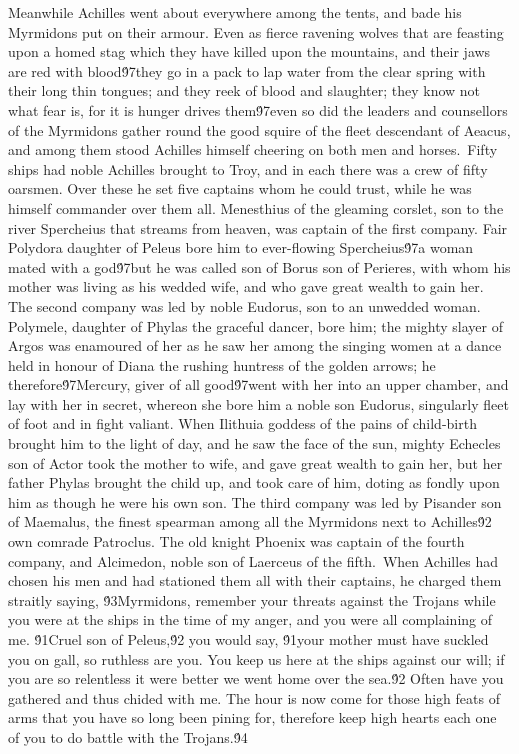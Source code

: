 {Meanwhile Achilles went about everywhere among the tents, and bade his Myrmidons put on their armour. Even as fierce ravening wolves that are feasting upon a homed stag which they have killed upon the mountains, and their jaws are red with blood\'97they go in a pack to lap water from the clear spring with their long thin tongues; and they reek of blood and slaughter; they know not what fear is, for it is hunger drives them\'97even so did the leaders and counsellors of the Myrmidons gather round the good squire of the fleet descendant of Aeacus, and among them stood Achilles himself cheering on both men and horses.\
Fifty ships had noble Achilles brought to Troy, and in each there was a crew of fifty oarsmen. Over these he set five captains whom he could trust, while he was himself commander over them all. Menesthius of the gleaming corslet, son to the river Spercheius that streams from heaven, was captain of the first company. Fair Polydora daughter of Peleus bore him to ever-flowing Spercheius\'97a woman mated with a god\'97but he was called son of Borus son of Perieres, with whom his mother was living as his wedded wife, and who gave great wealth to gain her. The second company was led by noble Eudorus, son to an unwedded woman. Polymele, daughter of Phylas the graceful dancer, bore him; the mighty slayer of Argos was enamoured of her as he saw her among the singing women at a dance held in honour of Diana the rushing huntress of the golden arrows; he therefore\'97Mercury, giver of all good\'97went with her into an upper chamber, and lay with her in secret, whereon she bore him a noble son Eudorus, singularly fleet of foot and in fight valiant. When Ilithuia goddess of the pains of child-birth brought him to the light of day, and he saw the face of the sun, mighty Echecles son of Actor took the mother to wife, and gave great wealth to gain her, but her father Phylas brought the child up, and took care of him, doting as fondly upon him as though he were his own son. The third company was led by Pisander son of Maemalus, the finest spearman among all the Myrmidons next to Achilles\'92 own comrade Patroclus. The old knight Phoenix was captain of the fourth company, and Alcimedon, noble son of Laerceus of the fifth.\
When Achilles had chosen his men and had stationed them all with their captains, he charged them straitly saying, \'93Myrmidons, remember your threats against the Trojans while you were at the ships in the time of my anger, and you were all complaining of me. \'91Cruel son of Peleus,\'92 you would say, \'91your mother must have suckled you on gall, so ruthless are you. You keep us here at the ships against our will; if you are so relentless it were better we went home over the sea.\'92 Often have you gathered and thus chided with me. The hour is now come for those high feats of arms that you have so long been pining for, therefore keep high hearts each one of you to do battle with the Trojans.\'94\
}
